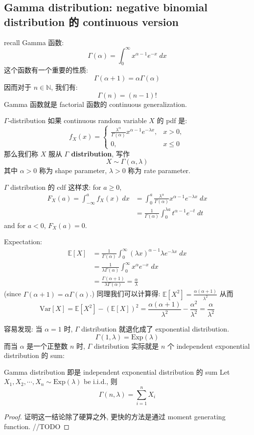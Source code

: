\subsection{Gamma distribution: negative binomial distribution 的 continuous version}
recall Gamma 函数:
\[
    \Gamma(\alpha) = \int_0^\infty x^{\alpha - 1} e^{-x}\; dx
\]
这个函数有一个重要的性质: \[
\Gamma(\alpha + 1) = \alpha \Gamma(\alpha)  
\]
因而对于 \(n\in \mathbb{N}\), 我们有: \[
\Gamma(n) = (n-1)!
\]
Gamma 函数就是 factorial 函数的 continuous generalization.

\begin{definition}{$\Gamma$-distribution}
如果 continuous random variable $X$ 的 pdf 是: 
$$
f_X(x)= \begin{cases}
\displaystyle \frac{\lambda^\alpha}{\Gamma(\alpha)} x^{\alpha-1} e^{-\lambda x}, & x>0, \\ 
0, & x \leq 0 
\end{cases}
$$
那么我们称 $X$ 服从 \textbf{$\Gamma$ distribution}, 写作\[
X \sim \Gamma(\alpha, \lambda)
\]
其中 $\alpha > 0$ 称为 shape parameter, $\lambda > 0$ 称为 rate parameter.
\end{definition}

\(\Gamma\) distribution 的 cdf 这样求: for \(a \geq 0\),
\begin{align*}
    F_X(a) = \int_{-\infty}^a f_X(x) \; dx &= \int_0^a \frac{\lambda^\alpha}{\Gamma(\alpha)} x^{\alpha -1} e^{-\lambda x} \; dx \\
    &= \frac{1}{\Gamma(\alpha)} \int_0^{\lambda a} t^{\alpha -1} e^{-t} \; dt
\end{align*}
and for \(a < 0\), \(F_X(a) = 0\).


Expectation:  
\begin{align*}
    \mathbb{E}[X] &= \frac{1}{\Gamma(\alpha)} \int_0^\infty (\lambda x )^{\alpha -1} \lambda  e^{-\lambda x} \; dx\\
    &=  \frac{1}{\lambda \Gamma(\alpha)}  \int_0^\infty x^\alpha e^{-x} \; dx \\
    &= \frac{\Gamma(\alpha + 1)}{\lambda \Gamma(\alpha)} = \frac{\alpha}{\lambda}
\end{align*}
(since $\Gamma(\alpha + 1) = \alpha \Gamma(\alpha)$.)
同理我们可以计算得: \(
\mathbb{E}[X^2] = \frac{\alpha(\alpha+1)}{\lambda^2}
\)
从而 \[
\text{Var}[X] = \mathbb{E}[X^2] - (\mathbb{E}[X])^2 = \frac{\alpha(\alpha+1)}{\lambda^2} - \frac{\alpha^2}{\lambda^2} = \frac{\alpha}{\lambda^2}
\] 

容易发现: 当 \(\alpha = 1\) 时, \(\Gamma\) distribution 就退化成了 exponential distribution.
\[
\Gamma(1,\lambda) = \text{Exp}(\lambda)  
\]
而当 \(\alpha\) 是一个正整数 \(n\) 时, \(\Gamma\) distribution 实际就是 \(n\) 个 
independent exponential distribution 的 sum: 
\begin{proposition}{Gamma distribution 即是 independent exponential distribution 的 sum}
Let \(X_1, X_2, \cdots, X_n \sim \text{Exp}(\lambda)\) be i.i.d., 则 
\[
\Gamma(n,\lambda) = \sum_{i=1}^n X_i
\]

\end{proposition}
\begin{proof}
    证明这一结论除了硬算之外, 更快的方法是通过 moment generating function. 
    //TODO
\end{proof}


